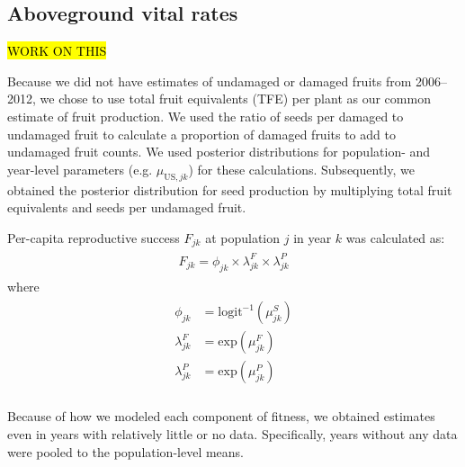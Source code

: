 \documentclass[12pt, oneside, titlepage]{article}   	%
\begin{document}
\subsection{Aboveground vital rates}

\hl{WORK ON THIS}

Because we did not have estimates of undamaged or damaged fruits from 2006--2012, we chose to use total fruit equivalents (TFE) per plant as our common estimate of fruit production. We used the ratio of seeds per damaged to undamaged fruit to calculate a proportion of damaged fruits to add to undamaged fruit counts. We used posterior distributions for population- and year-level parameters (e.g. $\mu_{\mathrm{US},jk}$) for these calculations. Subsequently, we obtained the posterior distribution for seed production by multiplying total fruit equivalents and seeds per undamaged fruit. 





Per-capita reproductive success $F_{jk}$ at population $j$ in year $k$ was calculated as:
%
\begin{align}
  \begin{split}
F_{jk} = \phi_{jk} \times \lambda^F_{jk} \times \lambda^P_{jk} \label{eq:percapitars}
  \end{split}
\end{align}
%
where
%
\begin{align}
  \begin{split}
\phi_{jk} & = \mathrm{logit}^{-1}(\mu^S_{jk}) \\
\lambda^F_{jk} & = \mathrm{exp}(\mu^F_{jk}) \\
\lambda^P_{jk} & = \mathrm{exp}(\mu^P_{jk}) \\
  \end{split}
\end{align}

Because of how we modeled each component of fitness, we obtained estimates even in years with relatively little or no data. Specifically, years without any data were pooled to the population-level means. 

\clearpage
\newpage
\end{document}
